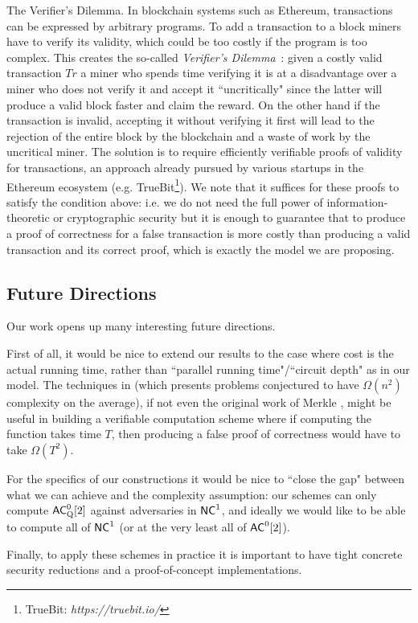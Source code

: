 \medskip
\noindent
{\sc The Verifier's Dilemma.}
In blockchain systems such as Ethereum, transactions can be expressed by arbitrary programs. To add a transaction to a block miners have to verify its validity, which could be too costly if the program is too complex. This creates the so-called {\em Verifier's Dilemma}~\cite{luu2015demystifying}: given a costly valid transaction $Tr$ a miner who spends time verifying it is at a disadvantage over a miner who does not verify it and accept it ``uncritically" since the latter will produce a valid block faster and claim the reward. On the other hand if the transaction is invalid, accepting it without verifying it first will lead to the rejection of the entire block by the blockchain and a waste of work by the uncritical miner.
The solution is to require efficiently verifiable proofs of validity for transactions, an approach already pursued by various startups in the Ethereum ecosystem (e.g. TrueBit\footnote{TrueBit: \textit{https://truebit.io/}}). We note that it suffices for these proofs to satisfy the condition above: i.e. we do not need the full power of information-theoretic or cryptographic security but it is enough to guarantee that to produce a proof of correctness for a false transaction is more costly than producing a valid transaction and its correct proof, which is exactly the model we are proposing. 


\subsection{Future Directions}

Our work opens up many interesting future directions. 

First of all, it would be nice to extend our results to the case where cost is the actual running time, rather than ``parallel running time"/``circuit depth" as in our model. The techniques in \cite{fghardness} (which presents problems conjectured to have $\Omega(n^2)$ complexity on the average), if not even the original work of Merkle \cite{merkle}, might be useful in building a verifiable computation scheme where if computing the function takes time $T$, then producing a false proof of correctness would have to take $\Omega(T^2)$. 

For the specifics of our constructions it would be nice to ``close the gap" between what we can achieve and the complexity assumption: our schemes can only compute ${\mathsf{AC}}^0_{\text{Q}}[2]$ against adversaries in ${\mathsf{NC}}^1$, and ideally we would like to be able to compute all of ${\mathsf{NC}}^1$ (or at the very least all of ${\mathsf{AC}}^0[2]$). 

Finally, to apply these schemes in practice it is important to have tight concrete security reductions and a proof-of-concept implementations. 



%

